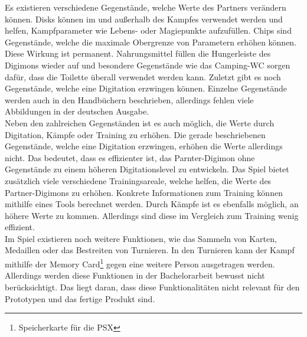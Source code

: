 Es existieren verschiedene Gegenstände, welche Werte des Partners verändern können. Disks können im und außerhalb des Kampfes verwendet werden und helfen, Kampfparameter wie Lebens- oder Magiepunkte aufzufüllen. Chips sind Gegenstände, welche die maximale Obergrenze von Parametern erhöhen können. Diese Wirkung ist permanent. Nahrungsmittel füllen die Hungerleiste des Digimons wieder auf und besondere Gegenstände wie das Camping-WC sorgen dafür, dass die Toilette überall verwendet werden kann. Zuletzt gibt es noch Gegenstände, welche eine Digitation erzwingen können. Einzelne Gegenstände werden auch in den Handbüchern beschrieben, allerdings fehlen viele Abbildungen in der deutschen Ausgabe.\\

Neben den zahlreichen Gegenständen ist es auch möglich, die Werte durch Digitation, Kämpfe oder Training zu erhöhen. Die gerade beschriebenen Gegenstände, welche eine Digitation erzwingen, erhöhen die Werte allerdings nicht. Das bedeutet, dass es effizienter ist, das Parnter-Digimon ohne Gegenstände zu einem höheren Digitationslevel zu entwickeln. Das Spiel bietet zusätzlich viele verschiedene Trainingsareale, welche helfen, die Werte des Partner-Digimons zu erhöhen. Konkrete Informationen zum Training können mithilfe eines Tools berechnet werden\cite{dw-training}. Durch Kämpfe ist es ebenfalls möglich, an höhere Werte zu kommen. Allerdings sind diese im Vergleich zum Training wenig effizient.\\

Im Spiel existieren noch weitere Funktionen, wie das Sammeln von Karten, Medaillen oder das Bestreiten von Turnieren. In den Turnieren kann der Kampf mithilfe der Memory Card\footnote{Speicherkarte für die \ac{PSX}} gegen eine weitere Person ausgetragen werden. Allerdings werden diese Funktionen in der Bachelorarbeit bewusst nicht berücksichtigt. Das liegt daran, dass diese Funktionalitäten nicht relevant für den Prototypen und das fertige Produkt sind.\\
